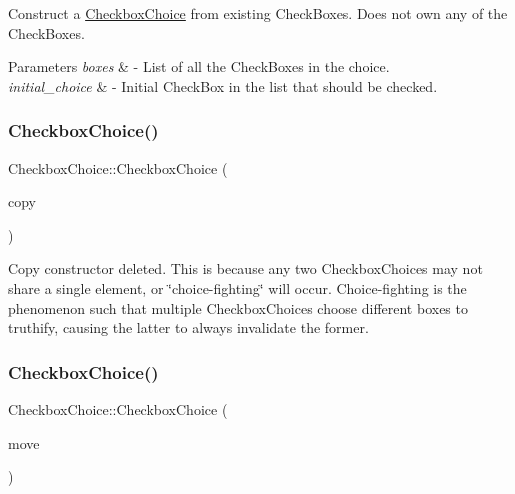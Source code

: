 Construct a \mbox{\hyperlink{class_checkbox_choice}{Checkbox\+Choice}} from existing Check\+Boxes. Does not own any of the Check\+Boxes. 
\begin{DoxyParams}{Parameters}
{\em boxes} & -\/ List of all the Check\+Boxes in the choice. \\
\hline
{\em initial\+\_\+choice} & -\/ Initial Check\+Box in the list that should be checked. \\
\hline
\end{DoxyParams}
\mbox{\label{class_checkbox_choice_a1434699c2e3295b5037010403cbab6c9}} 
\subsubsection{\texorpdfstring{Checkbox\+Choice()}{CheckboxChoice()}\hspace{0.1cm}{\footnotesize\ttfamily [3/4]}}
{\footnotesize\ttfamily Checkbox\+Choice\+::\+Checkbox\+Choice (\begin{DoxyParamCaption}\item[{const \mbox{\hyperlink{class_checkbox_choice}{Checkbox\+Choice}} \&}]{copy }\end{DoxyParamCaption})\hspace{0.3cm}{\ttfamily [delete]}}

Copy constructor deleted. This is because any two Checkbox\+Choices may not share a single element, or \char`\"{}choice-\/fighting\char`\"{} will occur. Choice-\/fighting is the phenomenon such that multiple Checkbox\+Choices choose different boxes to truthify, causing the latter to always invalidate the former. \mbox{\label{class_checkbox_choice_a907edd806c8e5a7ef45fdc64c013f4eb}} 
\subsubsection{\texorpdfstring{Checkbox\+Choice()}{CheckboxChoice()}\hspace{0.1cm}{\footnotesize\ttfamily [4/4]}}
{\footnotesize\ttfamily Checkbox\+Choice\+::\+Checkbox\+Choice (\begin{DoxyParamCaption}\item[{\mbox{\hyperlink{class_checkbox_choice}{Checkbox\+Choice}} \&\&}]{move }\end{DoxyParamCaption})\hspace{0.3cm}{\ttfamily [default]}}

